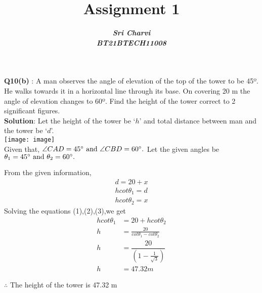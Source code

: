 \documentclass[journal,12pt,twocolumn]{IEEEtran}
\title{ Assignment 1}
\author{\textbf{\textit{Sri Charvi}}\\
\textbf{\textit{BT21BTECH11008}}}
\begin{document}
\maketitle
\textbf{Q10(b) }: A man observes the angle of elevation of the top of the tower to be 45º.
 He walks towards it in a horizontal line through its base. On covering 20 m the angle of 
elevation changes to 60º. Find the height of the tower correct to 2 significant figures.\\

\medskip
\textbf{Solution}: Let the height of the tower be `$h$' and total distance between man and the tower be `$d$'.\\

\texttt{[image: image]}\\
Given that, $ \angle CAD=45\degree \text{ and } \angle CBD=60\degree.$ Let the given angles
be $\theta_1=45\degree \text{ and } \theta_2=60\degree.$

From the given information,
\begin{align}
d=20+x\\
hcot\theta_1=d\\
hcot\theta_2=x
\end{align}
Solving the equations (1),(2),(3),we get
\begin{align*}
 hcot\theta_1&=20+hcot\theta_2\\
 h&=\frac{20}{cot\theta_1-cot\theta_2}\\
 h&=\dfrac{20}{\left(1-\frac{1}{\sqrt{3}}\right)}\\
 h &= 47.32m
\end{align*}

$\therefore $ The height of the tower is 47.32 m
\end{document}
